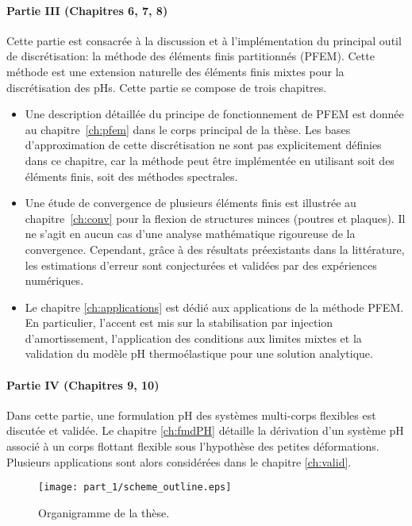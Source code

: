 \paragraph{Partie III (Chapitres 6, 7, 8)}
Cette partie est consacrée à la discussion et à l'implémentation du principal outil de discrétisation: la méthode des éléments finis partitionnés (PFEM). Cette méthode est une extension naturelle des éléments finis mixtes pour la discrétisation des pHs. Cette partie se compose de trois chapitres.
\begin{itemize}
\item Une description détaillée du principe de fonctionnement de PFEM est donnée au chapitre~\ref{ch:pfem} dans le corps principal de la thèse. Les bases d'approximation de cette discrétisation ne sont pas explicitement définies dans ce chapitre, car la méthode peut être implémentée en utilisant soit des éléments finis, soit des méthodes spectrales.
\item Une étude de convergence de plusieurs éléments finis est illustrée au chapitre~\ref{ch:conv} pour la flexion de structures minces (poutres et plaques). Il ne s'agit en aucun cas d'une analyse mathématique rigoureuse de la convergence. Cependant, grâce à des résultats préexistants dans la littérature, les estimations d'erreur sont conjecturées et validées par des expériences numériques.
\item Le chapitre \ref{ch:applications} est dédié aux applications de la méthode PFEM. En particulier, l'accent est mis sur la stabilisation par injection d'amortissement, l'application des conditions aux limites mixtes et la validation du modèle pH thermoélastique pour une solution analytique.
\end{itemize}

\paragraph {Partie IV (Chapitres 9, 10)}
Dans cette partie, une formulation pH des systèmes multi-corps flexibles est discutée et validée. Le chapitre \ref{ch:fmdPH} détaille la dérivation d'un système pH associé à un corps flottant flexible sous l'hypothèse des petites déformations. Plusieurs applications sont alors considérées dans le chapitre \ref{ch:valid}.


\begin{sidewaysfigure}
\centering
\texttt{[image: part\_1/scheme\_outline.eps]}%
\caption[]{Organigramme de la thèse.}%
\label{fig:organigramme}%
\end{sidewaysfigure}

